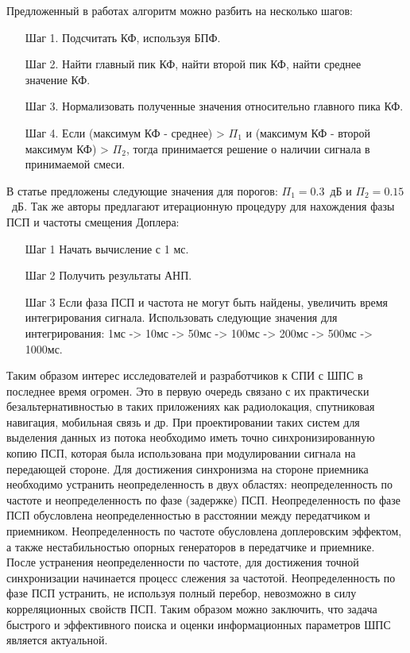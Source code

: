 Предложенный в работах алгоритм можно разбить на несколько шагов:
\begin{itemize}
	\item[Шаг 1.] Подсчитать КФ, используя БПФ.
	\item[Шаг 2.] Найти главный пик КФ, найти второй пик КФ, найти среднее значение КФ.
	\item[Шаг 3.] Нормализовать полученные значения относительно главного пика КФ.
	\item[Шаг 4.] Если (максимум КФ - среднее) > ${\Pi_1}$ и (максимум КФ - 
		второй максимум КФ) > ${\Pi_2}$, тогда принимается решение о наличии сигнала в принимаемой смеси. 
\end{itemize}

В статье \cite{2max_ieee} предложены следующие значения для порогов: \mbox{${\Pi_1} = 0.3$ дБ} и  \mbox{${\Pi_2} = 0.15$ дБ.}
Так же авторы предлагают итерационную процедуру для нахождения фазы ПСП и частоты смещения Доплера:
\begin{itemize}
	\item[Шаг 1] Начать вычисление с 1 мс.
	\item[Шаг 2] Получить результаты АНП.
	\item[Шаг 3] Если фаза ПСП и частота не могут быть найдены, увеличить время интегрирования сигнала.
		Использовать следующие значения для интегрирования: 1мс -> 10мс -> 50мс -> 100мс -> 200мс -> 500мс -> 1000мс.
\end{itemize}

Таким образом интерес исследователей и разработчиков к СПИ с ШПС в последнее время огромен. Это в первую очередь связано с их
практически безальтернативностью  в таких приложениях как радиолокация, спутниковая навигация, мобильная связь и др. При проектировании таких систем
для выделения данных из потока необходимо иметь точно синхронизированную копию ПСП, которая была использована
при модулировании сигнала на передающей стороне. Для достижения синхронизма на стороне приемника необходимо
устранить неопределенность в двух областях: неопределенность по частоте и неопределенность по фазе (задержке) ПСП.
Неопределенность по фазе ПСП обусловлена неопределенностью в расстоянии между передатчиком и приемником. Неопределенность
по частоте обусловлена доплеровским эффектом, а также нестабильностью опорных генераторов в
передатчике и приемнике. После устранения неопределенности по частоте, для достижения точной синхронизации
начинается процесс слежения за частотой. Неопределенность по фазе ПСП устранить, не используя полный перебор,
невозможно в силу корреляционных свойств ПСП. Таким образом можно заключить, что задача быстрого и эффективного
поиска и оценки информационных параметров ШПС является актуальной.

